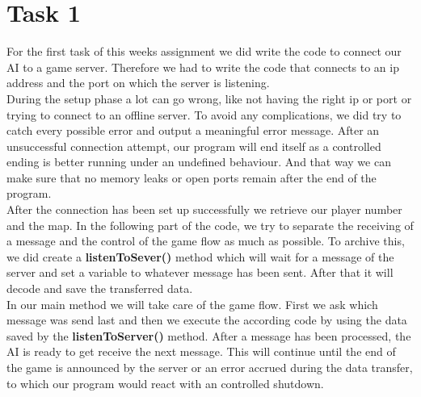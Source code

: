 \section{Task 1}

For the first task of this weeks assignment we did write the code to connect our AI to a game server. Therefore we had to write the code that connects to an ip address and the port on which the server is listening. \\

During the setup phase a lot can go wrong, like not having the right ip or port or trying to connect to an offline server. To avoid any complications, we did try to catch every possible error and output a meaningful error message. After an unsuccessful connection attempt, our program will end itself as a controlled ending is better running under an undefined behaviour. And that way we can make sure that no memory leaks or open ports remain after the end of the program.\\

After the connection has been set up successfully we retrieve our player number and the map. In the following part of the code, we try to separate the receiving of a message and the control of the game flow as much as possible. To archive this, we did create a \textbf{listenToSever()} method which will wait for a message of the server and set a variable to whatever message has been sent. After that it will decode and save the transferred data.\\
In our main method we will take care of the game flow. First we ask which message was send last and then we execute the according code by using the data saved by the \textbf{listenToServer()} method. After a message has been processed, the AI is ready to get receive the next message. This will continue until the end of the game is announced by the server or an error accrued during the data transfer, to which our program would react with an controlled shutdown.
